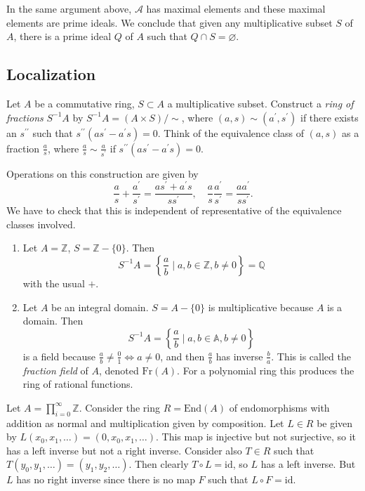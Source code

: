 \begin{remark}
In the same argument above, $\mathcal{A}$ has maximal elements and
these maximal elements are prime ideals. We conclude that given any
multiplicative subset $S$ of $A$, there is a prime ideal $Q$ of $A$
such that $Q \cap S = \varnothing$.
\end{remark}

\subsection{Localization}
Let $A$ be a commutative ring, $S \subset A$ a multiplicative
subset. Construct a \emph{ring of fractions} $S^{-1} A$ by
$S^{-1} A = (A \times S) / \sim$, where
$(a, s) \sim (a^\prime, s^\prime)$ if there exists an
$s^{\prime\prime}$ such that
$s^{\prime\prime}(as^\prime - a^\prime s) = 0$. Think of the
equivalence class of $(a, s)$ as a fraction $\frac{a}{s}$, where
$\frac{a}{s} \sim \frac{a}{s^\prime}$ if
$s^{\prime\prime}(as^\prime - a^\prime s) = 0$.

Operations on this construction are given by
$$
  \frac{a}{s} + \frac{a^\prime}{s^\prime}
= \frac{a s^\prime + a^\prime s}{s s^\prime}, \quad
  \frac{a}{s} \frac{a^\prime}{s^\prime}
= \frac{a a^\prime}{s s^\prime}.
$$
We have to check that this is independent of representative of the
equivalence classes involved.

\begin{xmpl}
\begin{enumerate}
  \item{
    Let $A = \mathbb{Z}$, $S = \mathbb{Z} - \{ 0 \}$. Then
    $$
      S^{-1} A
    = \left\{
        \frac{a}{b} \mid a, b \in \mathbb{Z}, b \neq 0
      \right\}
    = \mathbb{Q}
    $$
    with the usual $+$.
  }
  \item{
    Let $A$ be an integral domain. $S = A - \{ 0 \}$ is multiplicative
    because $A$ is a domain. Then
    $$
      S^{-1} A
    = \left\{
        \frac{a}{b} \mid a, b \in \mathbb{A}, b \neq 0
      \right\}
    $$
    is a field because $\frac{a}{b} \neq \frac{0}{1} \iff a \neq 0$,
    and then $\frac{a}{b}$ has inverse $\frac{b}{a}$. This is called
    the \emph{fraction field} of $A$, denoted $\mathrm{Fr}(A)$. For a
    polynomial ring this produces the ring of rational functions.
  }
\end{enumerate}
\end{xmpl}

\begin{xmpl}
Let $A = \prod_{i=0}^\infty \mathbb{Z}$. Consider the ring
$R = \mathrm{End}(A)$ of endomorphisms with addition as normal and
multiplication given by composition. Let
$L \in R$ be given by $L(x_0, x_1, \dots) = (0, x_0, x_1,
\dots)$. This map is injective but not surjective, so it has a left
inverse but not a right inverse. Consider also
$T \in R$ such that $T(y_0, y_1, \dots) = (y_1, y_2, \dots)$. Then
clearly $T \circ L = \mathrm{id}$, so $L$ has a left inverse. But
$L$ has no right inverse since there is no map $F$ such that
$L \circ F = \mathrm{id}$.
\end{xmpl}


